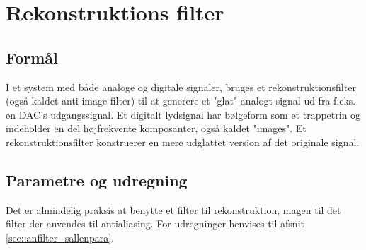 \section{Rekonstruktions filter}
\subsection{Formål}
I et system med både analoge og digitale signaler, bruges et rekonstruktionsfilter (også kaldet anti image filter) til at generere et "glat"  analogt signal ud fra f.eks. en DAC's udgangssignal. Et digitalt lydsignal har bølgeform som et trappetrin og indeholder en del højfrekvente komposanter, også kaldet "images". Et rekonstruktionsfilter konstruerer en mere udglattet version af det originale signal.
\subsection{Parametre og udregning}
Det er almindelig praksis at benytte et filter til rekonstruktion, magen til det filter der anvendes til antialiasing. For udregninger henvises til afsnit \ref{sec::anfilter_sallenpara}.

